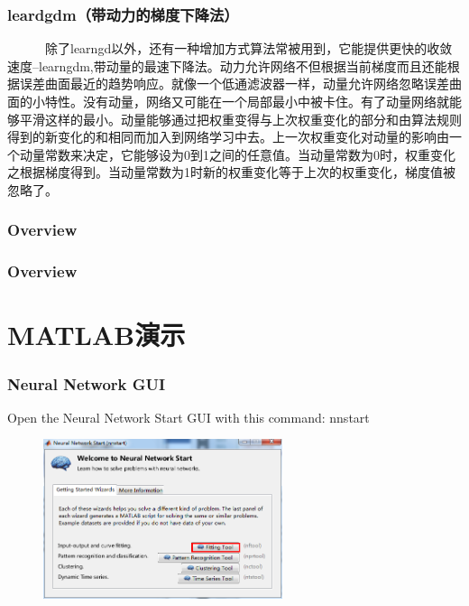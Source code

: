 \documentclass[slidestop,compress,mathserif,c]{beamer}
\begin{document}
\begin{frame}
\frametitle{leardgdm（带动力的梯度下降法）}
~~~~~~除了learngd以外，还有一种增加方式算法常被用到，它能提供更快的收敛速度--learngdm,带动量的最速下降法。动力允许网络不但根据当前梯度而且还能根据误差曲面最近的趋势响应。就像一个低通滤波器一样，动量允许网络忽略误差曲面的小特性。没有动量，网络又可能在一个局部最小中被卡住。有了动量网络就能够平滑这样的最小。动量能够通过把权重变得与上次权重变化的部分和由算法规则得到的新变化的和相同而加入到网络学习中去。上一次权重变化对动量的影响由一个动量常数来决定，它能够设为0到1之间的任意值。当动量常数为0时，权重变化之根据梯度得到。当动量常数为1时新的权重变化等于上次的权重变化，梯度值被忽略了。

\end{frame}


\begin{frame}
\frametitle{Overview}


\end{frame}


\begin{frame}
\frametitle{Overview}


\end{frame}

\section{MATLAB演示}
\begin{frame}
\frametitle{Neural Network GUI}
Open the Neural Network Start GUI with this command:
nnstart
\begin{figure}
\centering
\includegraphics[width=7cm]{1}
\end{figure}


\end{frame}
\end{document}
